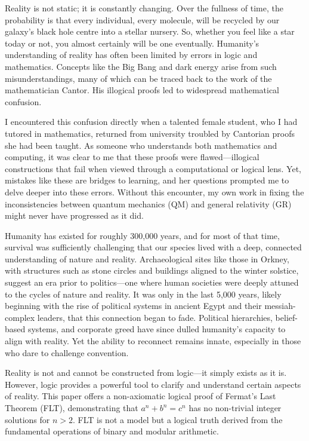 \documentclass[12pt]{article}
\begin{document}
Reality is not static; it is constantly changing. Over the fullness of time, the probability is that every individual, every molecule, will be recycled by our galaxy’s black hole centre into a stellar nursery. So, whether you feel like a star today or not, you almost certainly will be one eventually. Humanity’s understanding of reality has often been limited by errors in logic and mathematics. Concepts like the Big Bang and dark energy arise from such misunderstandings, many of which can be traced back to the work of the mathematician Cantor. His illogical proofs led to widespread mathematical confusion.

I encountered this confusion directly when a talented female student, who I had tutored in mathematics, returned from university troubled by Cantorian proofs she had been taught. As someone who understands both mathematics and computing, it was clear to me that these proofs were flawed—illogical constructions that fail when viewed through a computational or logical lens. Yet, mistakes like these are bridges to learning, and her questions prompted me to delve deeper into these errors. Without this encounter, my own work in fixing the inconsistencies between quantum mechanics (QM) and general relativity (GR) might never have progressed as it did.

Humanity has existed for roughly 300,000 years, and for most of that time, survival was sufficiently challenging that our species lived with a deep, connected understanding of nature and reality. Archaeological sites like those in Orkney, with structures such as stone circles and buildings aligned to the winter solstice, suggest an era prior to politics—one where human societies were deeply attuned to the cycles of nature and reality. It was only in the last 5,000 years, likely beginning with the rise of political systems in ancient Egypt and their messiah-complex leaders, that this connection began to fade. Political hierarchies, belief-based systems, and corporate greed have since dulled humanity’s capacity to align with reality. Yet the ability to reconnect remains innate, especially in those who dare to challenge convention.

Reality is not and cannot be constructed from logic—it simply exists as it is. However, logic provides a powerful tool to clarify and understand certain aspects of reality. This paper offers a non-axiomatic logical proof of Fermat’s Last Theorem (FLT), demonstrating that \(a^n + b^n = c^n\) has no non-trivial integer solutions for \(n > 2\). FLT is not a model but a logical truth derived from the fundamental operations of binary and modular arithmetic.
\end{document}

